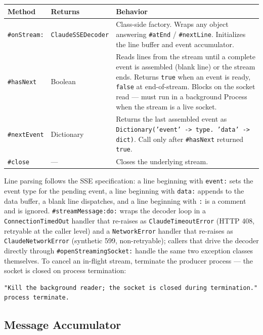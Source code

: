 \documentclass[a4paper,10pt,fleqn]{article}
\newcommand{\cls}[1]{\texttt{#1}}
\newcommand{\sel}[1]{\texttt{\##1}}
\begin{document}
\begin{center}
\small
\begin{tabular}{@{}llp{6cm}@{}}
\toprule
\textbf{Method} & \textbf{Returns} & \textbf{Behavior} \\
\midrule
\sel{onStream:}  & \cls{ClaudeSSEDecoder} &
  Class-side factory.  Wraps any object answering
  \sel{atEnd} / \sel{nextLine}.  Initializes the line buffer
  and event accumulator. \\
\sel{hasNext}    & Boolean &
  Reads lines from the stream until a complete event is
  assembled (blank line) or the stream ends.  Returns
  \texttt{true} when an event is ready, \texttt{false} at
  end-of-stream.  Blocks on the socket read --- must run in a
  background Process when the stream is a live socket. \\
\sel{nextEvent}  & Dictionary &
  Returns the last assembled event as
  \texttt{Dictionary('event' -> type. 'data' -> dict)}.
  Call only after \sel{hasNext} returned \texttt{true}. \\
\sel{close}      & --- &
  Closes the underlying stream. \\
\bottomrule
\end{tabular}
\end{center}

Line parsing follows the SSE specification: a line beginning
with \texttt{event:} sets the event type for the pending event,
a line beginning with \texttt{data:} appends to the data
buffer, a blank line dispatches, and a line beginning with
\texttt{:} is a comment and is ignored.
\sel{streamMessage:do:} wraps the decoder loop in a
\texttt{ConnectionTimedOut} handler that re-raises as
\cls{ClaudeTimeoutError} (HTTP 408, retryable at the caller
level) and a \texttt{NetworkError} handler that re-raises as
\cls{ClaudeNetworkError} (synthetic 599, non-retryable);
callers that drive the decoder directly through
\sel{openStreamingSocket:} handle the same two exception
classes themselves.  To cancel an in-flight stream, terminate
the producer process --- the socket is closed on process
termination:

\begin{lstlisting}[language={}]
"Kill the background reader; the socket is closed during termination."
process terminate.
\end{lstlisting}

\subsection{Message Accumulator}
\end{document}
